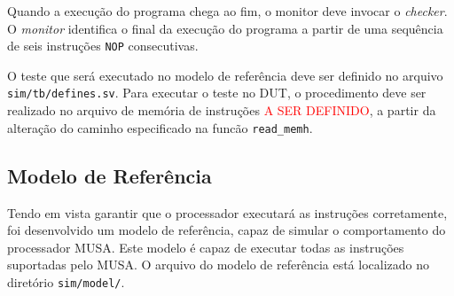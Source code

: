 \documentclass{article}
\begin{document}
  Quando a execução do programa chega ao fim, o monitor deve invocar o \textit{checker}. O \textit{monitor} identifica o final da execução do programa a partir de uma sequência de seis instruções \texttt{NOP} consecutivas.

	O teste que será executado no modelo de referência deve ser definido no arquivo \texttt{sim/tb/defines.sv}. Para executar o teste no DUT, o procedimento deve ser realizado no arquivo de memória de instruções \textcolor{red}{A SER DEFINIDO}, a partir da alteração do caminho especificado na funcão \texttt{read\_memh}.

	\subsection{Modelo de Referência}
  Tendo em vista garantir que o processador executará as instruções corretamente, foi desenvolvido um modelo de referência, capaz de simular o comportamento do processador MUSA. Este modelo é capaz de executar todas as instruções suportadas pelo MUSA. O arquivo do modelo de referência está localizado no diretório \texttt{sim/model/}.
	
\end{document}
